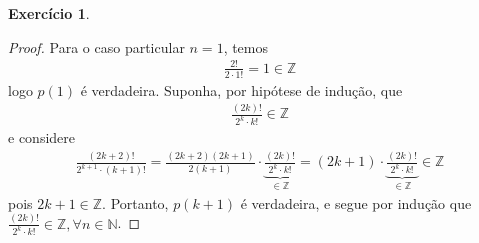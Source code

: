 \documentclass[a4paper,12pt]{article}
\theoremstyle{definition}
\newtheorem{exercise}{Exercício}%
\begin{document}
	\begin{exercise}
		\begin{proof}
			Para o caso particular $n=1$, temos
			\begin{align*}
			\frac{2!}{2\cdot 1!} = 1\in\mathbb{Z}
			\end{align*}
			logo $p(1)$ é verdadeira. Suponha, por hipótese de indução, que
			\begin{align*}
			\frac{(2k)!}{2^k\cdot k!}\in\mathbb{Z}
			\end{align*} 
			e considere
			\begin{align*}
			\frac{(2k+2)!}{2^{k+1}\cdot (k+1)!} = \frac{ (2k+2)(2k+1) }{2(k+1) }\cdot\underbrace{\frac{(2k)!}{2^k\cdot k!}}_{\in\mathbb{Z}} = (2k+1)\cdot\underbrace{\frac{(2k)!}{2^k\cdot k!}}_{\in\mathbb{Z}}\in\mathbb{Z}
			\end{align*}
			pois $2k+1\in\mathbb{Z}$. Portanto, $p(k+1)$ é verdadeira, e segue por indução que $\displaystyle{ \frac{(2k)!}{2^k\cdot k!}\in\mathbb{Z},\forall n\in\mathbb{N} }$. 
		\end{proof}
	\end{exercise}
	
	
	
\end{document}
